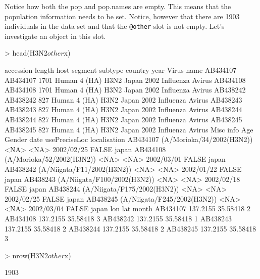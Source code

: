 \documentclass[letterpaper]{article}
\begin{document}
Notice how both the pop and pop.names are empty. This means that the population information needs to be set. Notice, however that there are 1903 individuals in the data set and that the \texttt{@other} slot is not empty. Let's investigate an object in this slot.
\begin{Schunk}
\begin{Sinput}
> head(H3N2$other$x)
\end{Sinput}
\begin{Soutput}
         accession length  host segment subtype country year       Virus name
AB434107  AB434107   1701 Human  4 (HA)    H3N2   Japan 2002 Influenza Avirus
AB434108  AB434108   1701 Human  4 (HA)    H3N2   Japan 2002 Influenza Avirus
AB438242  AB438242    827 Human  4 (HA)    H3N2   Japan 2002 Influenza Avirus
AB438243  AB438243    827 Human  4 (HA)    H3N2   Japan 2002 Influenza Avirus
AB438244  AB438244    827 Human  4 (HA)    H3N2   Japan 2002 Influenza Avirus
AB438245  AB438245    827 Human  4 (HA)    H3N2   Japan 2002 Influenza Avirus
                           Misc info  Age Gender       date usePreciseLoc localisation
AB434107   (A/Morioka/34/2002(H3N2)) <NA>   <NA> 2002/02/25         FALSE        japan
AB434108   (A/Morioka/52/2002(H3N2)) <NA>   <NA> 2002/03/01         FALSE        japan
AB438242  (A/Niigata/F11/2002(H3N2)) <NA>   <NA> 2002/01/22         FALSE        japan
AB438243 (A/Niigata/F100/2002(H3N2)) <NA>   <NA> 2002/02/18         FALSE        japan
AB438244 (A/Niigata/F175/2002(H3N2)) <NA>   <NA> 2002/02/25         FALSE        japan
AB438245 (A/Niigata/F245/2002(H3N2)) <NA>   <NA> 2002/03/04         FALSE        japan
              lon      lat month
AB434107 137.2155 35.58418     2
AB434108 137.2155 35.58418     3
AB438242 137.2155 35.58418     1
AB438243 137.2155 35.58418     2
AB438244 137.2155 35.58418     2
AB438245 137.2155 35.58418     3
\end{Soutput}
\begin{Sinput}
> nrow(H3N2$other$x)
\end{Sinput}
\begin{Soutput}
[1] 1903
\end{Soutput}
\end{Schunk}
\begin{center}
\end{center}
\end{document}
